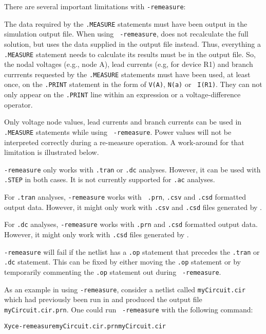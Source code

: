 There are several important limitations with {\tt -remeasure}:
\begin{XyceItemize}

  \item The data required by the {\tt .MEASURE} statements must have
  been output in the simulation output file.  When using {\tt
  -remeasure}, \Xyce{} does not recalculate the full solution, but
  uses the data supplied in the output file instead.  Thus, everything
  a {\tt .MEASURE} statement needs to calculate its results must be in
  the output file.  So, the nodal voltages (e.g., node A), lead
  currents (e.g, for device R1) and branch currrents requested by the
  {\tt .MEASURE} statements must have been used, at least once, on the
  {\tt .PRINT} statement in the form of {\tt V(A)}, {\tt N(a)} or {\tt
  I(R1)}.  They can not only appear on the {\tt .PRINT} line within an
  expression or a voltage-difference operator.

  \item Only voltage node values, lead currents and branch currents
  can be used in {\tt .MEASURE} statements while using {\tt
  -remeasure}.  Power values will not be interpreted correctly during
  a re-measure operation.  A work-around for that limitation is
  illustrated below.

  \item {\tt -remeasure} only works with {\tt .tran} or {\tt .dc}
  analyses.  However, it can be used with {\tt .STEP} in both
  cases. It is not currently supported for {\tt .ac} analyses.

  \item For {\tt .tran} analyses, {\tt -remeasure} works with {\tt
  .prn}, {\tt .csv} and {\tt .csd} formatted output data.  However, it
  might only work with {\tt .csv} and {\tt .csd} files generated
  by \Xyce{}.  \item For {\tt .dc} analyses, {\tt -remeasure} works
  with {\tt .prn} and {\tt .csd} formatted output data.  However, it
  might only work with {\tt .csd} files generated by \Xyce{}.

  \item {\tt -remeasure} will fail if the netlist has a {\tt .op}
  statement that precedes the {\tt .tran} or {\tt .dc} statement.
  This can be fixed by either moving the {\tt .op} statement or by
  temporarily commenting the {\tt .op} statement out during {\tt
  -remeasure}.
\end{XyceItemize}

As an example in using {\tt -remeasure}, consider a netlist called
{\tt myCircuit.cir} which had previously been run in \Xyce{} and
produced the output file {\tt myCircuit.cir.prn}.  One could run {\tt
-remeasure} with the following command:
\begin{alltt}
Xyce -remeasure myCircuit.cir.prn myCircuit.cir
\end{alltt}

